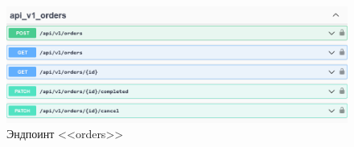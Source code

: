 \begin{figure}[!p]
    \centering

    \includegraphics[width=16cm]
    {images/swagger/orders.png}

    \caption{Эндпоинт <<orders>>}

    \label{fig:swagger_orders}
\end{figure}

